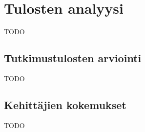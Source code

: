 \vspace{21.5pt}
\chapter{Tulosten analyysi}
TODO

\section{Tutkimustulosten arviointi}
TODO

\section{Kehittäjien kokemukset}
TODO